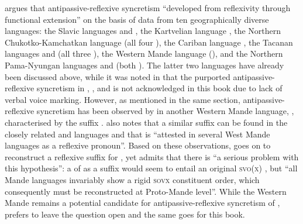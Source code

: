 \cite[159]{janic:2010} argues that antipassive-reflexive syncretism “developed from reflexivity through functional extension” on the basis of data from ten geographically diverse languages: the Slavic languages  and , the Kartvelian language , the Northern Chukotko-Kamchatkan language  (all four ), the Cariban language , the Tacanan languages  and  (all three ), the Western Mande language  (), and the Northern Pama-Nyungan languages  and  (both ). The latter two languages have already been discussed above, while it was noted in  that the purported antipassive-reflexive syncretism in , ,  and  is not acknowledged in this book due to lack of verbal voice marking. However, as mentioned in the same section, antipassive-reflexive syncretism has been observed by \cite{creissels:2012, creissels:2015} in another Western Mande language, , characterised by the suffix . \cite[13]{creissels:2015} also notes that a similar suffix can be found in the closely related  and  languages and that  is “attested in several West Mande languages as a reflexive pronoun”. Based on these observations, \cite[13]{creissels:2015} goes on to reconstruct a reflexive suffix  for , yet admits that there is “a serious problem with this hypothesis”: a  of  as a suffix would seem to entail an original \textsc{svo(x)} , but “all Mande languages invariably show a rigid \textsc{sovx} constituent order, which consequently must be reconstructed at Proto-Mande level”. While the Western Mande  remains a potential candidate for antipassive-reflexive syncretism of , \citeauthor{creissels:2015} prefers to leave the question open and the same goes for this book.

